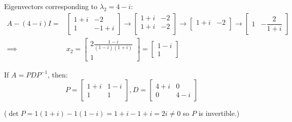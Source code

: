 \documentclass{article}
\begin{document}
Eigenvectors corresponding to $\lambda_2=4-i$:
\begin{align*}
    A-(4-i)I 
	={}& \begin{bmatrix}
		1+i & -2 \\
		1 & -1+i
	\end{bmatrix}
	\rightarrow \begin{bmatrix}
		1+i & -2 \\
		1+i & -2 \\
	\end{bmatrix}
	\rightarrow \begin{bmatrix}
		1+i & -2 \\
	\end{bmatrix}
	\rightarrow \begin{bmatrix}
		1 & -\dfrac{2}{1+i}
	\end{bmatrix} \\
	\implies{}& x_2=\begin{bmatrix}
	    2 \frac{1-i}{(1-i)(1+i)} \\
		1
	\end{bmatrix}
	=\begin{bmatrix}
	    1-i \\ 1
	\end{bmatrix}
\end{align*}

If $A=PDP^{-1}$, then:
\begin{equation*}
	P=\begin{bmatrix}
		1+i & 1-i \\
		1 & 1
	\end{bmatrix},
	D=\begin{bmatrix}
		4+i & 0 \\
		0 & 4-i
	\end{bmatrix}
\end{equation*}

($\det P=1(1+i)-1(1-i)=1+i-1+i=2i\neq0$ so $P$ is invertible.)
\end{document}
